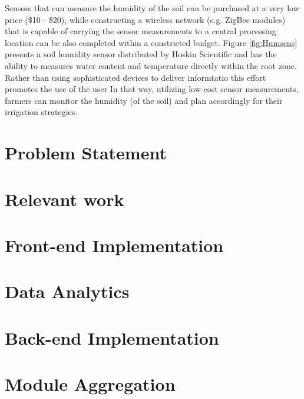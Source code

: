 \documentclass{article}
\begin{document}
Sensors that can measure the humidity of the soil can be purchased at a very low price (\$10 - \$20), while constructing a wireless network (e.g. ZigBee modules) that is capable of carrying the sensor measurements to a central processing location can be also completed within a constricted budget. Figure \ref{fig:Humsens} presents a soil humidity sensor distributed by Hoskin Scientific and has the ability to measures water content and temperature directly within the root zone. Rather than using sophisticated devices to deliver informtatio this effort promotes the use of the user In that way, utilizing low-cost sensor measurements, farmers can monitor the humidity (of the soil) and plan accordingly for their irrigation strategies.







\section{Problem Statement}

\section{Relevant work}



\section{Front-end Implementation}

\section{Data Analytics}

\section{Back-end Implementation}

\section{Module Aggregation}
\end{document}
